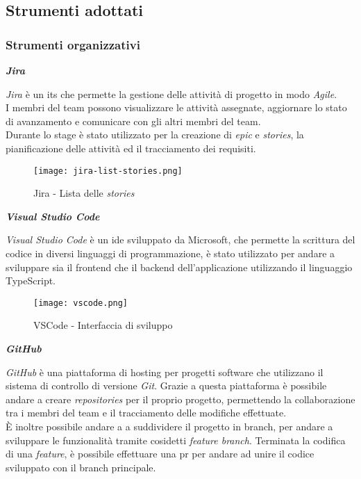 \pagebreak
\subsection{Strumenti adottati}
\label{sez:strumenti-adottati}

\subsubsection{Strumenti organizzativi}
\label{sez:strumenti-organizzativi}

\noindent \textbf{\textit{Jira\\}} 

\noindent \textit{Jira} è un \gls{its} che permette la gestione delle attività di progetto in modo \textit{Agile}.\\
I membri del team possono visualizzare le attività assegnate, aggiornare lo stato di avanzamento e comunicare con gli altri membri del team. \\
Durante lo stage è stato utilizzato per la creazione di \textit{epic} e \textit{stories}, la pianificazione delle attività ed il tracciamento dei requisiti.

\begin{figure}[H]
    \label{fig:jira-list-stories}
    \caption{Jira - Lista delle \textit{stories}}
    \centering
    \texttt{[image: jira-list-stories.png]}
\end{figure}



\noindent \textbf{\textit{Visual Studio Code\\}}

\noindent \textit{Visual Studio Code} è un \gls{ide} sviluppato da Microsoft, che permette la scrittura del codice in diversi linguaggi di programmazione, è stato utilizzato per andare
a sviluppare sia il \gls{frontend} che il \gls{backend} dell'applicazione utilizzando il linguaggio TypeScript.\\

\begin{figure}[H]
    \label{fig:vscode}
    \caption{VSCode - Interfaccia di sviluppo} 
    \centering
    \texttt{[image: vscode.png]}
\end{figure}

\pagebreak  
\noindent \textbf{\textit{GitHub\\}}

\noindent \textit{GitHub} è una piattaforma di hosting per progetti software che utilizzano il sistema di controllo di versione \textit{Git}.
Grazie a questa piattaforma è possibile andare a creare \textit{repositories} per il proprio progetto, permettendo la collaborazione tra i membri del team e il tracciamento delle modifiche effettuate. \\
È inoltre possibile andare a a suddividere il progetto in \gls{branch}, per andare a sviluppare le funzionalità tramite cosidetti \textit{feature branch}.
Terminata la codifica di una \textit{feature}, è possibile effettuare una \gls{pr} per andare ad unire il codice sviluppato con il \gls{branch} principale.

